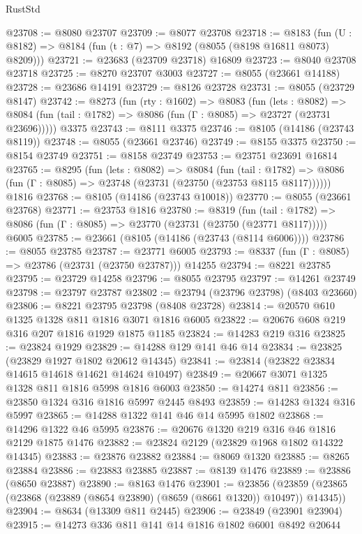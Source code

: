 \begin{lexlean}{RustStd}
\begin{coremodule}
@23708 := @8080 @23707
@23709 := @8077 @23708
@23718 := @8183
    (fun (U : @8182) => @8184 (fun (t : @7) => @8192 (@8055 (@8198 @16811 @8073) @8209)))
@23721 := @23683 (@23709 @23718) @16809
@23723 := @8040 @23708 @23718
@23725 := @8270 @23707 @3003
@23727 := @8055 (@23661 @14188)
@23728 := @23686 @14191
@23729 := @8126 @23728
@23731 := @8055 (@23729 @8147)
@23742 := @8273
    (fun (rty : @1602) =>
    @8083
      (fun (lets : @8082) =>
      @8084 (fun (tail : @1782) => @8086 (fun (Γ : @8085) => @23727 (@23731 @23696)))))
    @3375
@23743 := @8111 @3375
@23746 := @8105 (@14186 (@23743 @8119))
@23748 := @8055 (@23661 @23746)
@23749 := @8155 @3375
@23750 := @8154 @23749
@23751 := @8158 @23749
@23753 := @23751 @23691 @16814
@23765 := @8295
    (fun (lets : @8082) =>
    @8084
      (fun (tail : @1782) =>
      @8086 (fun (Γ : @8085) => @23748 (@23731 (@23750 (@23753 @8115 @8117))))))
    @1816
@23768 := @8105 (@14186 (@23743 @10018))
@23770 := @8055 (@23661 @23768)
@23771 := @23753 @1816
@23780 := @8319
    (fun (tail : @1782) => @8086 (fun (Γ : @8085) => @23770 (@23731 (@23750 (@23771 @8117)))))
    @6005
@23785 := @23661 (@8105 (@14186 (@23743 (@8114 @6006))))
@23786 := @8055 @23785
@23787 := @23771 @6005
@23793 := @8337 (fun (Γ : @8085) => @23786 (@23731 (@23750 @23787))) @14255
@23794 := @8221 @23785
@23795 := @23729 @14258
@23796 := @8055 @23795
@23797 := @14261 @23749
@23798 := @23797 @23787
@23802 := @23794 (@23796 @23798) (@8403 @23660)
@23806 := @8221 @23795 @23798 (@8408 @23728)
@23814 := @20570 @610 @1325 @1328 @811 @1816 @3071 @1816 @6005
@23822 := @20676 @608 @219 @316 @207 @1816 @1929 @1875 @1185
@23824 := @14283 @219 @316
@23825 := @23824 @1929
@23829 := @14288 @129 @141 @46 @14
@23834 := @23825 (@23829 @1927 @1802 @20612 @14345)
@23841 := @23814 (@23822 @23834 @14615 @14618 @14621 @14624 @10497)
@23849 := @20667 @3071 @1325 @1328 @811 @1816 @5998 @1816 @6003
@23850 := @14274 @811
@23856 := @23850 @1324 @316 @1816 @5997 @2445 @8493
@23859 := @14283 @1324 @316 @5997
@23865 := @14288 @1322 @141 @46 @14 @5995 @1802
@23868 := @14296 @1322 @46 @5995
@23876 := @20676 @1320 @219 @316 @46 @1816 @2129 @1875 @1476
@23882 := @23824 @2129 (@23829 @1968 @1802 @14322 @14345)
@23883 := @23876 @23882
@23884 := @8069 @1320
@23885 := @8265 @23884
@23886 := @23883 @23885
@23887 := @8139 @1476
@23889 := @23886 (@8650 @23887)
@23890 := @8163 @1476
@23901 := @23856
    (@23859 (@23865 (@23868 (@23889 (@8654 @23890) (@8659 (@8661 @1320)) @10497)) @14345))
@23904 := @8634 (@13309 @811 @2445)
@23906 := @23849 (@23901 @23904)
@23915 := @14273 @336 @811 @141 @14 @1816 @1802 @6001 @8492 @20644

\end{coremodule}
\end{lexlean}
